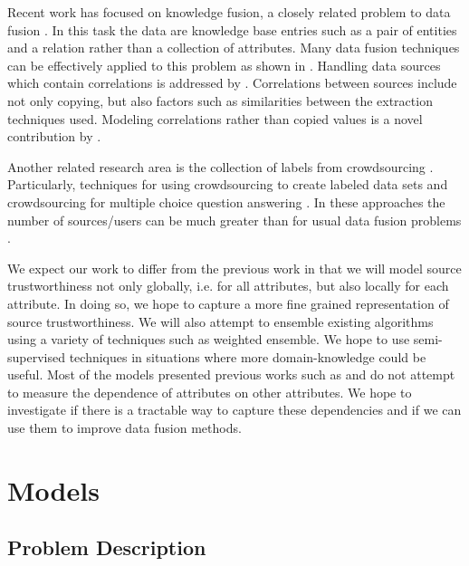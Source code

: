 \documentclass{acm_proc_article-sp}
\begin{document}
Recent work has focused on knowledge fusion, a closely related problem to data fusion \cite{dong:data} \cite{pochampally:fusing} \cite{yu:wisdom}.  In this task the data are knowledge base entries such as a pair of entities and a relation rather than a collection of attributes. Many data fusion techniques can be effectively applied to this problem as shown in \cite{dong:data}. Handling data sources which contain correlations is addressed by \cite{pochampally:fusing}. Correlations between sources include not only copying, but also factors such as similarities between the extraction techniques used. Modeling correlations rather than copied values is a novel contribution by  \cite{pochampally:fusing}.


Another related research area is the collection of labels from crowdsourcing \cite{nguyen:minimizing}. Particularly, techniques for using crowdsourcing to create labeled data sets \cite{sheng:get} \cite{nguyen:minimizing} and crowdsourcing for multiple choice question answering \cite{bachrach:grade}. In these approaches the number of sources/users can be much greater than for usual data fusion problems \cite{li:truth} \cite{nguyen:minimizing}.

We expect our work to differ from the previous work in that we will model source trustworthiness not only globally, i.e. for all attributes, but also locally for each attribute. In doing so, we hope to capture a more fine grained representation of source trustworthiness. We will also attempt to ensemble existing algorithms using a variety of techniques such as weighted ensemble. We hope to use semi-supervised techniques in situations where more domain-knowledge could be useful. Most of the models presented previous works such as \cite{pasternack:latent} and \cite{li:resolving} do not attempt to measure the dependence of attributes on other attributes. We hope to investigate if there is a tractable way to capture these dependencies and if we can use them to improve data fusion methods.

\vspace{2cm}

\section{Models}

\subsection{Problem Description}
\end{document}
